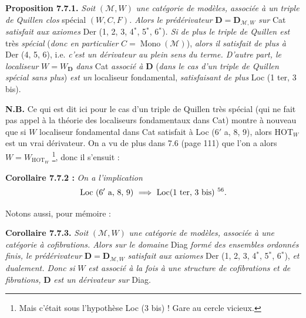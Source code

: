 \textbf{Proposition 7.7.1.} \textit{Soit} $(\mathcal{M},W)$ \textit{une catégorie de modèles, associée à un triple de Quillen clos} spécial $(W,C,F)$\textit{. Alors le prédérivateur} $\mathbf{D}=\mathbf{D}_{\mathcal{M},W}$ \textit{sur} Cat \textit{satisfait aux axiomes} Der (1, 2, 3, 4$^*$, 5$^*$, 6$^*$)\textit{. Si de plus le triple de Quillen est} très \textit{spécial} (\textit{donc en particulier} $C=\operatorname{Mono}(\mathcal{M})$), \textit{alors il satisfait de plus à} Der (4, 5, 6), i.e. \textit{c'est un dérivateur au plein sens du terme. D'autre part, le localiseur} $W=W_{\mathbf{D}}$ \textit{dans} Cat \textit{associé à} $\mathbf{D}$ (\textit{dans le cas d'un triple de Quillen spécial sans plus}) \textit{est un} localiseur fondamental, \textit{satisfaisant de plus} Loc (1 ter, 3 bis).

\textbf{N.B.} Ce qui est dit ici pour le cas d'un triple de Quillen très spécial (qui ne fait pas appel à la théorie des localiseurs
fondamentaux dans Cat) montre à nouveau que si $W$ localiseur fondamental dans Cat satisfait à Loc (6$'$ a, 8, 9), alors $\mathrm{HOT}_W$ est un vrai dérivateur. On a vu de plus dans 7.6 (page 111) que l'on a alors $W=W_{\mathrm{HOT}_W}$ \footnote[55]{Mais c'était sous l'hypothèse Loc (3 bis) ! Gare au cercle vicieux.}, donc il s'ensuit :

\textbf{Corollaire 7.7.2 :} \textit{On a l'implication}
\[ \text{Loc } (6'\text{ a, 8, 9})\ \Longrightarrow\ \text{Loc(1 ter, 3 bis)}\ \text{\footnotemark[56]}. \]

Notons aussi, pour mémoire :

\textbf{Corollaire 7.7.3.} \textit{Soit} $(\mathcal{M},W)$ \textit{une catégorie de modèles, associée à une catégorie à cofibrations. Alors sur le domaine} Diag \textit{formé des ensembles ordonnés finis, le prédérivateur} $\mathbf{D}=\mathbf{D}_{\mathcal{M},W}$ \textit{satisfait aux axiomes} Der (1, 2, 3, 4$^*$, 5$^*$, 6$^*$), \textit{et dualement. Donc si} $W$ \textit{est associé à la fois à une structure de cofibrations et de fibrations,} $\mathbf{D}$ \textit{est un dérivateur sur} Diag.


